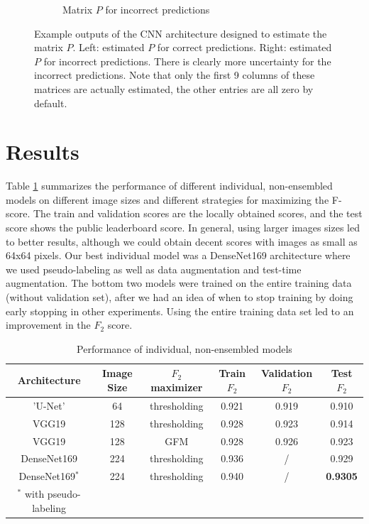 \documentclass[fleqn]{homework}
\begin{document}
\begin{figure}
\begin{subfigure}{0.48\linewidth}
      \caption{Matrix $P$ for incorrect predictions}
   \end{subfigure}
  \caption{Example outputs of the CNN architecture designed to estimate the matrix $P$. Left: estimated $P$ for correct predictions. Right: estimated $P$ for incorrect predictions. There is clearly more uncertainty for the incorrect predictions. Note that only the first 9 columns of these matrices are actually estimated, the other entries are all zero by default.}
	\label{GFMoutput} 
\end{figure}

\section{Results}

Table \ref{resultstable} summarizes the performance of different individual, non-ensembled models on different image sizes and different strategies for maximizing the F-score. The train and validation scores are the locally obtained scores, and the test score shows the public leaderboard score. In general, using larger images sizes led to better results, although we could obtain decent scores with images as small as 64x64 pixels. Our best individual model was a DenseNet169 architecture where we used pseudo-labeling as well as data augmentation and test-time augmentation. The bottom two models were trained on the entire training data (without validation set), after we had an idea of when to stop training by doing early stopping in other experiments. Using the entire training data set led to an improvement in the $F_2$ score.  

\begin{table}[H]
\centering
\begin{tabular}{c c c c c c }
\textbf{Architecture} & \textbf{Image Size} & \textbf{$F_2$ maximizer} & Train $F_2$& Validation $F_2$ & Test $F_2$\\
\hline
'U-Net' & 64 & thresholding & 0.921 & 0.919 & 0.910 \\
VGG19 & 128 & thresholding  & 0.928 & 0.923 & 0.914 \\
VGG19 & 128 & GFM & 0.928 & 0.926 & 0.923\\
DenseNet169 & 224 & thresholding & 0.936 & / & 0.929 \\
DenseNet169$^*$ & 224 & thresholding & 0.940  & / & \textbf{0.9305} \\
\hline
\footnotesize{$^*$ with pseudo-labeling} & & & & & \\
\end{tabular}
\caption{Performance of individual, non-ensembled models}
\label{resultstable}
\end{table}
\end{document}
